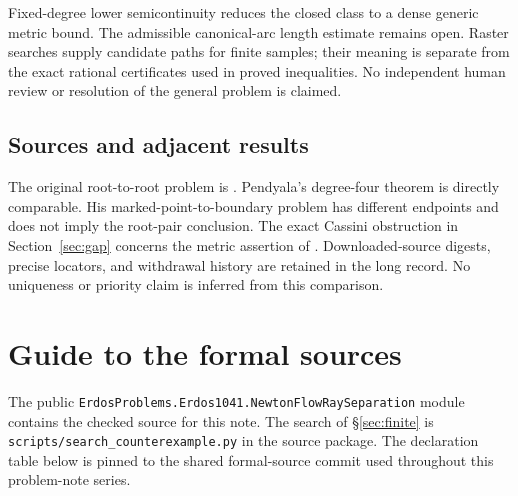\documentclass[11pt]{article}
\begin{document}
Fixed-degree lower semicontinuity reduces the closed class to a dense generic
metric bound.  The admissible canonical-arc length estimate remains open.
Raster searches supply candidate paths for finite samples; their meaning is
separate from the exact rational certificates used in proved inequalities.
No independent human review or resolution of the general problem is claimed.

\subsection*{Sources and adjacent results}\label{sec:1041-sources}

The original root-to-root problem is \cite[p.~139, Problem~5]{ehp1958}.
Pendyala's degree-four theorem \cite[Thm.~1, p.~1]{june2026} is directly comparable.
His marked-point-to-boundary problem \cite{pendyala2026shortest} has different
endpoints and does not imply the root-pair conclusion.  The exact Cassini
obstruction in Section~\ref{sec:gap} concerns the metric assertion of
\cite[Prop.~12]{march2026}.  Downloaded-source digests, precise locators,
and withdrawal history are retained in the long record.  No uniqueness or
priority claim is inferred from this comparison.

\appendix
\section{Guide to the formal sources}\label{app:sources}

The public \texttt{ErdosProblems.Erdos1041.NewtonFlowRaySeparation} module
contains the checked source for this note.  The search of \S\ref{sec:finite} is
\texttt{scripts/search\_counterexample.py} in the source package.  The
declaration table below is pinned to the shared formal-source commit used
throughout this problem-note series.
\end{document}

